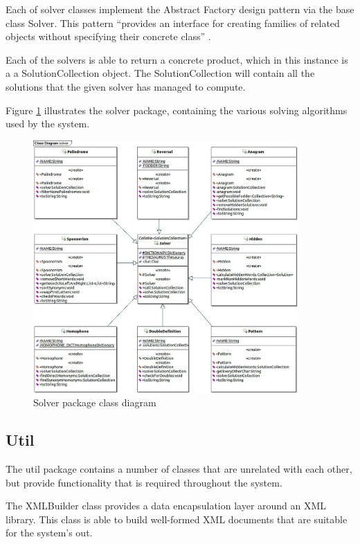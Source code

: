 Each of solver classes implement the Abstract Factory design pattern via the 
base class Solver. This pattern ``provides an interface for creating families of
related objects without specifying their concrete class'' \citep{gof}.

Each of the solvers is able to return a concrete product, which in this instance
is a a SolutionCollection object. The SolutionCollection will contain all the 
solutions that the given solver has managed to compute. 

Figure \ref{fig:solver_package} illustrates the solver package, containing the
various solving algorithms used by the system.

\begin{figure}[H]
  \centering
  \includegraphics[width=0.9\textwidth]{design/class/solver.jpg}
  \caption{Solver package class diagram}
  \label{fig:solver_package}
\end{figure}


\subsection{Util}
\label{sub:util}

The util package contains a number of classes that are unrelated with each 
other, but provide functionality that is required throughout the system.

The XMLBuilder class provides a data encapsulation layer around an XML library. 
This class is able to build well-formed XML documents that are suitable for the
system's out.

